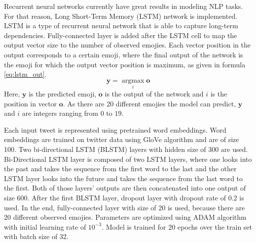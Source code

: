 Recurrent neural networks currently have great results in modeling NLP tasks.
For that reason, Long Short-Term Memory (LSTM) network is implemented.
LSTM is a type of recurrent neural network that is able to capture long-term dependencies.
Fully-connected layer is added after the LSTM cell to map the output vector size to the number of observed emojies.
Each vector position in the output corresponds to a certain emoji, where the final output of the network is the emoji for which the output vector position is maximum, as given in formula \eqref{eq:lstm_out}.
\begin{equation}
	\label{eq:lstm_out}
	\boldsymbol{y} = \operatorname*{argmax}_{i} \boldsymbol{o}
\end{equation}
Here, $\boldsymbol{y}$ is the predicted emoji, $\boldsymbol{o}$ is the output of the network and $i$ is the position in vector $\boldsymbol{o}$.
As there are 20 different emojies the model can predict, $\boldsymbol{y}$ and $i$ are integers ranging from $0$ to $19$.

Each input tweet is represented using pretrained word embeddings.
Word embeddings are trained on twitter data using GloVe algorithm and are of size 100.
Two bi-directional LSTM (BLSTM) layers with hidden size of 300 are used.
Bi-Directional LSTM layer is composed of two LSTM layers, where one looks into the past and takes the sequence from the first word to the last and the other LSTM layer looks into the future and takes the sequence from the last word to the first.
Both of those layers' outputs are then concatenated into one output of size 600.
After the first BLSTM layer, dropout layer with dropout rate of $0.2$ is used.
In the end, fully-connected layer with size of 20 is used, because there are 20 different observed emojies.
Parameters are optimized using ADAM algorithm with initial learning rate of $10^{-3}$.
Model is trained for $20$ epochs over the train set with batch size of $32$.